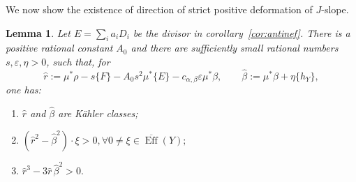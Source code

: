 \documentclass[reqno]{amsart}
\theoremstyle{remark}
\newcommand{\cab}{c_{\alpha,\beta}}
\theoremstyle{plain}
\newtheorem{lemma}[thm]{Lemma}
\begin{document}
We now show the existence of direction of strict positive deformation of $J$-slope. 
\begin{lemma}\label{lem:strict-cone-blowup}Let $E=\sum_ia_iD_i$ be the divisor in corollary~\ref{cor:antinef}.
There is a positive rational constant $A_0$ and there are sufficiently
small rational numbers $s,\varepsilon,\eta >0$,
such that, for
\[
 \widehat r
 :=\mu^*\rho-s\{F\}-A_0s^2\mu^*\{E\}-\cab\varepsilon\mu^*\beta, \qquad \widehat\beta:=\mu^*\beta+\eta \{h_Y\},
\]
one has:
\begin{enumerate}[label=\textup{(\roman*)}]
\item $\widehat r$ and $\widehat\beta$ are K\"ahler classes;
\item $(\widehat r^2-\widehat\beta^2)\cdot \xi>0, \forall 0\neq  \xi\in\overline{\operatorname{Eff}}(Y);$
\item $\widehat r^3-3\widehat r\,\widehat\beta^2>0.$
\end{enumerate}
\end{lemma}
\end{document}
